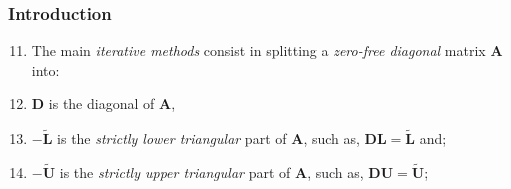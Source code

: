 \documentclass[10pt,compress,handout,ignorenonframetext]{beamer}
\begin{document}
\begin{frame}
  \frametitle{Introduction} 
  \begin{enumerate}
  \setcounter{enumi}{10}
     \item <1-> The main {\it iterative methods} consist in splitting a {\it zero-free diagonal} matrix $\bm{A}$ into:
     \item <3-> $\bm{D}$ is the diagonal of $\bm{A}$, 
     \item <4-> $-\tilde{\bm{L}}$ is the {\it strictly lower triangular} part of $\bm{A}$, such as, $\bm{D}\bm{L}=\tilde{\bm{L}}$ and;
     \item <5-> $-\tilde{\bm{U}}$ is the {\it strictly upper triangular} part of $\bm{A}$, such as, $\bm{D}\bm{U}=\tilde{\bm{U}}$;
  \end{enumerate}
\end{frame}
\end{document}
